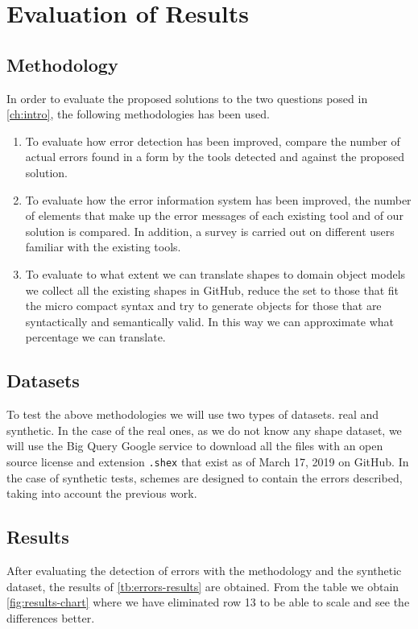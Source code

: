 \chapter{Evaluation of Results}
\label{ch:results-evaluation}

\section{Methodology}
In order to evaluate the proposed solutions to the two questions posed in \cref{ch:intro},
the following methodologies has been used.

\begin{enumerate}
    \item To evaluate how error detection has been improved, compare the number of actual errors found
    in a form by the tools detected and against the proposed solution.
    
    \item To evaluate how the error information system has been improved, the number of elements that
    make up the error messages of each existing tool and of our solution is compared. In addition,
    a survey is carried out on different users familiar with the existing tools.

    \item To evaluate to what extent we can translate shapes to domain object models we collect all the
    existing shapes in GitHub, reduce the set to those that fit the micro compact syntax and try to
    generate objects for those that are syntactically and semantically valid. In this way we can
    approximate what percentage we can translate.
\end{enumerate}

\section{Datasets}
To test the above methodologies we will use two types of datasets.
real and synthetic. In the case of the real ones, as we do not know
any shape dataset, we will use the Big Query Google service to download
all the files with an open source license and extension \texttt{.shex}
that exist as of March 17, 2019 on GitHub. In the case of synthetic tests,
schemes are designed to contain the errors described, taking into account
the previous work.

\section{Results}
After evaluating the detection of errors with the methodology and the synthetic dataset,
the results of \cref{tb:errors-results} are obtained. From the table we obtain \cref{fig:results-chart}
where we have eliminated row 13 to be able to scale and see the differences better.

